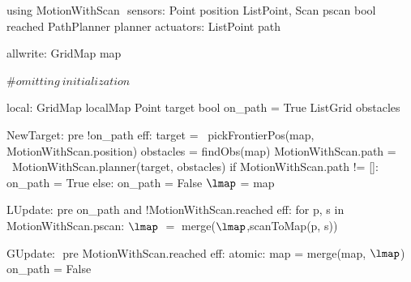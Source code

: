 using MotionWithScan $\label{moddef}$
    sensors:
        Point position
        List\<Point, Scan\> pscan
        bool reached
        PathPlanner planner
    actuators:
        List\<Point\> path

allwrite:$\label{awvar}$
    GridMap map

#$\mathit{omitting\ initialization}$

local:
   GridMap localMap
   Point target
   bool on_path = True
   List\<Grid\> obstacles

NewTarget:$\label{newpt}$
  pre !on_path
  eff:
     target = \
        pickFrontierPos(map, MotionWithScan.position)
     obstacles = findObs(map)
     MotionWithScan.path = \
        MotionWithScan.planner(target, obstacles)
     if MotionWithScan.path != []:
        on_path = True
     else:
        on_path = False
     $\lmap$ = map

LUpdate:$\label{lup}$
   pre on_path and !MotionWithScan.reached
   eff:
      for p, s in MotionWithScan.pscan:
         $\lmap$ $=$ merge($\lmap$,scanToMap(p, s))

GUpdate: $\label{gup}$
  pre MotionWithScan.reached
  eff: atomic:
        map = merge(map, $\lmap$)
        on_path = False
